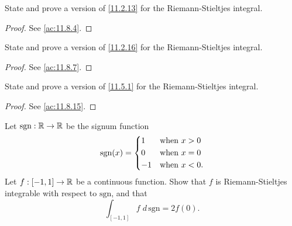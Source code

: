 \begin{ex}\label{ex:11.8.2}
  State and prove a version of \cref{11.2.13} for the Riemann-Stieltjes integral.
\end{ex}

\begin{proof}
  See \cref{ac:11.8.4}.
\end{proof}

\begin{ex}\label{ex:11.8.3}
  State and prove a version of \cref{11.2.16} for the Riemann-Stieltjes integral.
\end{ex}

\begin{proof}
  See \cref{ac:11.8.7}.
\end{proof}

\begin{ex}\label{ex:11.8.4}
  State and prove a version of \cref{11.5.1} for the Riemann-Stieltjes integral.
\end{ex}

\begin{proof}
  See \cref{ac:11.8.15}.
\end{proof}

\begin{ex}\label{ex:11.8.5}
  Let \(\text{sgn} : \mathbb{R} \to \mathbb{R}\) be the signum function
  \[
    \text{sgn}(x) = \begin{dcases}
      1  & \text{when } x > 0  \\
      0  & \text{when } x = 0  \\
      -1 & \text{when } x < 0.
    \end{dcases}
  \]
  Let \(f : [-1, 1] \to \mathbb{R}\) be a continuous function.
  Show that \(f\) is Riemann-Stieltjes integrable with respect to \(\text{sgn}\), and that
  \[
    \int_{[-1, 1]} f \; d \, \text{sgn} = 2f(0).
  \]
\end{ex}

